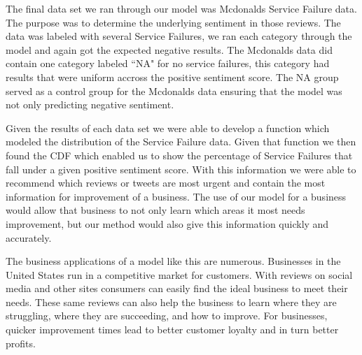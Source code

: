 \documentclass[titlepage,letterpaper]{article}
\begin{document}
The final data set we ran through our model was Mcdonalds Service Failure data. The purpose was to determine the underlying sentiment in those reviews. The data was labeled with several Service Failures, we ran each category through the model and again got the expected negative results. The Mcdonalds data did contain one category labeled ``NA" for no service failures, this category had results that were uniform accross the positive sentiment score. The NA group served as a control group for the Mcdonalds data ensuring that the model was not only predicting negative sentiment. 

Given the results of each data set we were able to develop a function which modeled the distribution of the Service Failure data. Given that function we then found the CDF which enabled us to show the percentage of Service Failures that fall under a given positive sentiment score. With this information we were able to recommend which reviews or tweets are most urgent and contain the most information for improvement of a business. The use of our model for a business would allow that business to not only learn which areas it most needs improvement, but our method would also give this information quickly and accurately.

The business applications of a model like this are numerous. Businesses in the United States run in a competitive market for customers. With reviews on social media and other sites consumers can easily find the ideal business to meet their needs. These same reviews can also help the business to learn where they are struggling, where they are succeeding, and how to improve. For businesses, quicker improvement times lead to better customer loyalty and in turn better profits.   



\clearpage 

\printbibliography
\end{document}
